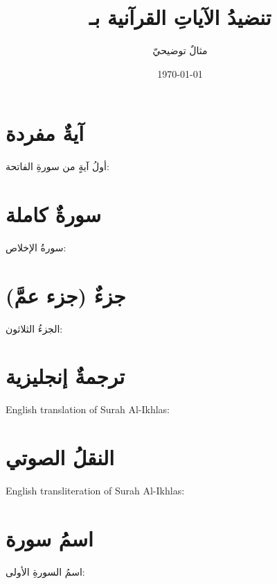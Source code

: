 \documentclass[12pt, a4paper]{article}
\title{تنضيدُ الآياتِ القرآنية بـ\LR{LaTeX}}
\author{مثالٌ توضيحيّ}
\date{\today}
\begin{document}
\maketitle

\section{آيةٌ مفردة}

أولُ آيةٍ من سورةِ الفاتحة:

\quranayah[1][1]

\section{سورةٌ كاملة}

سورةُ الإخلاص:

\quransurah[112]

\section{جزءٌ (جزء عمَّ)}

الجزءُ الثلاثون:

\quranjuz[30]

\section{ترجمةٌ إنجليزية}

English translation of Surah Al-Ikhlas:

\quransurahen[112]

\section{النقلُ الصوتي}

English transliteration of Surah Al-Ikhlas:

\quransurahlt[112]

\section{اسمُ سورة}

اسمُ السورةِ الأولى: \surahname[1]
\end{document}
